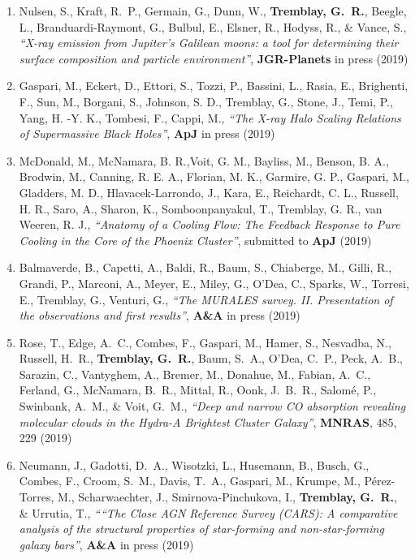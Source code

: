 \documentclass[11pt]{article}
\begin{document}
\begin{enumerate}[resume]

\item Nulsen, S., Kraft, R.~P., Germain, G., Dunn, W.,
\textbf{Tremblay, G.~R.}, Beegle, L., Branduardi-Raymont, G.,
Bulbul, E., Elsner, R., Hodyss, R., \& Vance, S., \textit{``X-ray emission
from Jupiter's Galilean moons: a tool for determining their surface
composition and particle environment''}, \textbf{JGR-Planets} in press (2019)


\item Gaspari, M., Eckert, D., Ettori, S., Tozzi, P., Bassini, L., Rasia, E., Brighenti, F., Sun, M., Borgani, S., Johnson, S. D., Tremblay, G., Stone, J., Temi, P., Yang, H. -Y. K., Tombesi, F., Cappi, M., \textit{``The X-ray Halo Scaling Relations of Supermassive Black Holes''}, \textbf{ApJ} in press (2019)

\item McDonald, M., McNamara, B. R.,Voit, G. M., Bayliss, M., Benson, B. A., Brodwin, M., Canning, R. E. A., Florian, M. K., Garmire, G. P., Gaspari, M., Gladders, M. D., Hlavacek-Larrondo, J., Kara, E., Reichardt, C. L., Russell, H. R., Saro, A., Sharon, K., Somboonpanyakul, T., Tremblay, G. R., van Weeren, R. J., \textit{``Anatomy of a Cooling Flow: The Feedback Response to Pure Cooling in the Core of the Phoenix Cluster''}, submitted to \textbf{ApJ} (2019)


\item Balmaverde, B., Capetti, A., Baldi, R., Baum, S., Chiaberge, M., Gilli, R., Grandi, P., Marconi, A., Meyer, E., Miley, G., O'Dea, C., Sparks, W., Torresi, E., Tremblay, G., Venturi, G., \textit{``The MURALES survey. II. Presentation of the observations and first results''}, \textbf{A\&A} in press (2019)

\item Rose, T., Edge, A.~C., Combes, F., Gaspari, M., Hamer, S., Nesvadba, N.,
Russell, H.~R., \textbf{Tremblay, G.~R.}, Baum, S.~A., O'Dea, C.~P., Peck, A.~B.,
Sarazin, C., Vantyghem, A., Bremer, M., Donahue, M., Fabian, A.~C., Ferland, G.,
McNamara, B.~R., Mittal, R., Oonk, J.~B.~R., Salom\'{e}, P., Swinbank, A.~M.,
\& Voit, G.~M., \textit{``Deep and narrow CO absorption revealing molecular clouds in the Hydra-A Brightest Cluster Galaxy''}, \textbf{MNRAS}, 485, 229 (2019)


\item Neumann, J., Gadotti, D.~A., Wisotzki, L., Husemann, B., Busch, G.,
Combes, F., Croom, S.~M., Davis, T.~A., Gaspari, M., Krumpe, M., P\'{e}rez-Torres,
M., Scharwaechter, J., Smirnova-Pinchukova, I., \textbf{Tremblay, G.~R.},
\& Urrutia, T., \textit{````The Close AGN Reference Survey (CARS): A comparative analysis of the structural properties of star-forming and non-star-forming galaxy bars''},
\textbf{A\&A} in press (2019)



\end{enumerate}
\end{document}
